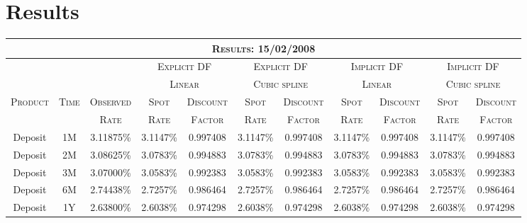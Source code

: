 \section{Results}
\label{results}

\begin{landscape}

\begin{table}[ht]
\begin{center}
\begin{tabular}{ccc|cc|cc|cc|cc}

\multicolumn{11}{c}{\textsc{Results: 15/02/2008}} \\
\toprule
 & & & \multicolumn{2}{c}{\textsc{Explicit DF}} & \multicolumn{2}{c}{\textsc{Explicit DF}} & \multicolumn{2}{c}{\textsc{Implicit DF}} & \multicolumn{2}{c}{\textsc{Implicit DF}} \\
 
 & & & \multicolumn{2}{c}{\textsc{Linear}} & \multicolumn{2}{c}{\textsc{Cubic spline}} & \multicolumn{2}{c}{\textsc{Linear}} & \multicolumn{2}{c}{\textsc{Cubic spline}} \\

\toprule
\multirow{2}{*}{\textsc{Product}} & \multirow{2}{*}{\textsc{Time}} & \textsc{Observed} & \textsc{Spot} & \textsc{Discount} & \textsc{Spot} & \textsc{Discount} & \textsc{Spot} & \textsc{Discount} & \textsc{Spot} & \textsc{Discount}\\

 & & \textsc{Rate} & \textsc{Rate} & \textsc{Factor} & \textsc{Rate} & \textsc{Factor} & \textsc{Rate} & \textsc{Factor} & \textsc{Rate} & \textsc{Factor} \\
\toprule

Deposit & 1M & 3.11875\% & 3.1147\% & 0.997408 & 3.1147\% & 0.997408 & 3.1147\% & 0.997408 & 3.1147\% & 0.997408 \\
Deposit & 2M & 3.08625\% & 3.0783\% & 0.994883 & 3.0783\% & 0.994883 & 3.0783\% & 0.994883 & 3.0783\% & 0.994883 \\
Deposit & 3M & 3.07000\% & 3.0583\% & 0.992383 & 3.0583\% & 0.992383 & 3.0583\% & 0.992383 & 3.0583\% & 0.992383 \\
Deposit & 6M & 2.74438\% & 2.7257\% & 0.986464 & 2.7257\% & 0.986464 & 2.7257\% & 0.986464 & 2.7257\% & 0.986464 \\
Deposit & 1Y & 2.63800\% & 2.6038\% & 0.974298 & 2.6038\% & 0.974298 & 2.6038\% & 0.974298 & 2.6038\% & 0.974298 \\


\end{tabular}
\end{center}
\end{table}
\end{landscape}
